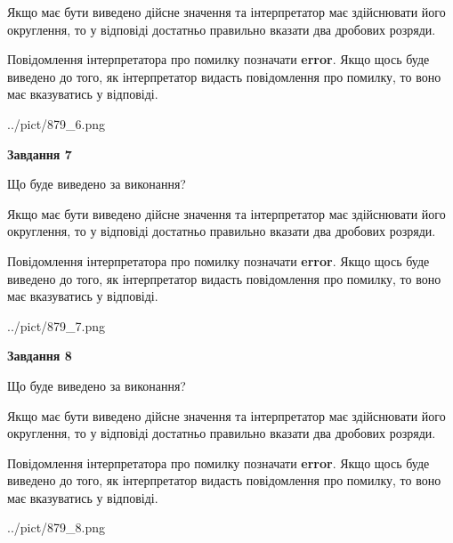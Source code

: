 \documentclass[12pt, ukrainian]{article}
\begin{document}
{\begin {Large}
Якщо має бути виведено дійсне значення та інтерпретатор має здійснювати його округлення, 
то у відповіді достатньо правильно вказати два дробових розряди.

Повідомлення інтерпретатора про помилку позначати \textbf{error}.
Якщо щось буде виведено до того, як інтерпретатор видасть повідомлення про помилку, 
то воно має вказуватись у відповіді. \par

\begin{center}
	{../pict/879_6.png}
\end{center}
\newpage

{\begin {center}\textbf{Завдання 7}\end {center}}\par
Що буде виведено за виконання? \par

Якщо має бути виведено дійсне значення та інтерпретатор має здійснювати його округлення, 
то у відповіді достатньо правильно вказати два дробових розряди.

Повідомлення інтерпретатора про помилку позначати \textbf{error}.
Якщо щось буде виведено до того, як інтерпретатор видасть повідомлення про помилку, 
то воно має вказуватись у відповіді. \par

\begin{center}
	{../pict/879_7.png}
\end{center}
\newpage

{\begin {center}\textbf{Завдання 8}\end {center}}\par
Що буде виведено за виконання? \par

Якщо має бути виведено дійсне значення та інтерпретатор має здійснювати його округлення, 
то у відповіді достатньо правильно вказати два дробових розряди.

Повідомлення інтерпретатора про помилку позначати \textbf{error}.
Якщо щось буде виведено до того, як інтерпретатор видасть повідомлення про помилку, 
то воно має вказуватись у відповіді. \par

\begin{center}
	{../pict/879_8.png}
\end{center}
\newpage


\end{Large}}
\end{document}

